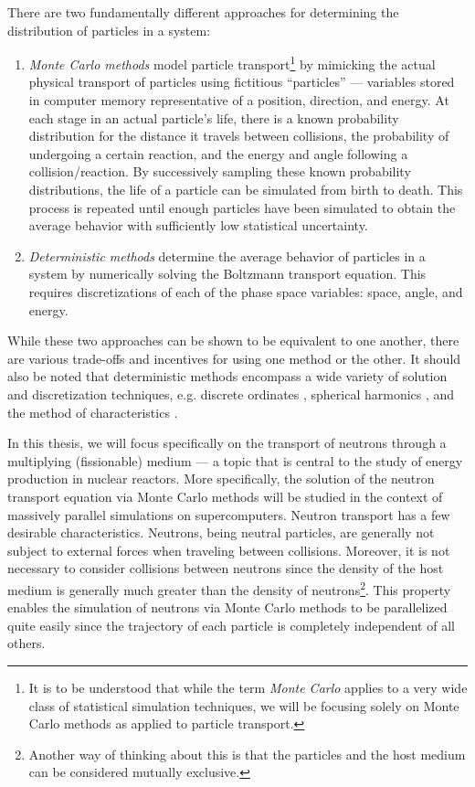 There are two fundamentally different approaches for determining the
distribution of particles in a system:
\begin{enumerate}
\item \emph{Monte Carlo methods} model particle transport\footnote{It is to be
  understood that while the term \emph{Monte Carlo} applies to a very wide class
  of statistical simulation techniques, we will be focusing solely on Monte
  Carlo methods as applied to particle transport.} by mimicking the actual
  physical transport of particles using fictitious ``particles'' --- variables
  stored in computer memory representative of a position, direction, and
  energy. At each stage in an actual particle's life, there is a known
  probability distribution for the distance it travels between collisions, the
  probability of undergoing a certain reaction, and the energy and angle
  following a collision/reaction. By successively sampling these known
  probability distributions, the life of a particle can be simulated from birth
  to death. This process is repeated until enough particles have been simulated
  to obtain the average behavior with sufficiently low statistical uncertainty.
\item \emph{Deterministic methods} determine the average behavior of particles
  in a system by numerically solving the Boltzmann transport equation. This
  requires discretizations of each of the phase space variables: space, angle,
  and energy.
\end{enumerate}
While these two approaches can be shown to be equivalent to one another, there
are various trade-offs and incentives for using one method or the other. It
should also be noted that deterministic methods encompass a wide variety of
solution and discretization techniques, e.g. discrete ordinates
\cite{carlson-1965}, spherical harmonics \cite{bell-1970}, and the method of
characteristics \cite{physor-smith-2002}.

In this thesis, we will focus specifically on the transport of neutrons through
a multiplying (fissionable) medium --- a topic that is central to the study of
energy production in nuclear reactors. More specifically, the solution of the
neutron transport equation via Monte Carlo methods will be studied in the
context of massively parallel simulations on supercomputers. Neutron transport
has a few desirable characteristics. Neutrons, being neutral particles, are
generally not subject to external forces when traveling between
collisions. Moreover, it is not necessary to consider collisions between
neutrons since the density of the host medium is generally much greater than the
density of neutrons\footnote{Another way of thinking about this is that the
  particles and the host medium can be considered mutually exclusive.}. This
property enables the simulation of neutrons via Monte Carlo methods to be
parallelized quite easily since the trajectory of each particle is completely
independent of all others.

